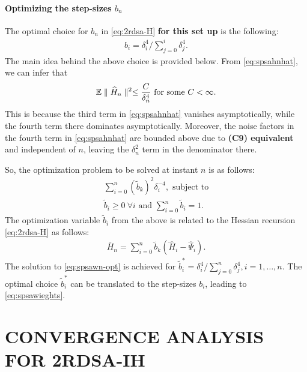 \documentclass[twocolumn]{IEEEtran}
\begin{document}
\paragraph{\textbf{Optimizing the step-sizes }$b_n$}

The optimal choice for $b_n$ in \eqref{eq:2rdsa-H} \textbf {for this set up} is the following:
\begin{align}
\label{eq:spsawieghts}
b_i  = \delta_i^{4}/\sum\limits_{j=0}^{i} \delta_j^{4}.
\end{align}
The main idea behind the above choice is provided below.
From \eqref{eq:spsahnhat}, we can infer that
\begin{align*}
\mathbb{E} \parallel \widehat H_n \parallel^2 \le \dfrac{C}{\delta_n^4} \text{ for some } C<\infty. 
\end{align*} 
This is because the third term in \eqref{eq:spsahnhat} vanishes asymptotically, while the fourth term there dominates asymptotically. Moreover, the noise factors in the fourth term in \eqref{eq:spsahnhat} are bounded above due to \textbf{(C9) equivalent } and independent of $n$, leaving the $\delta_n^2$ term in the denominator there. 

So, the optimization problem to be solved at instant $n$ is as follows:
\begin{align}
\sum \limits_{i=0}^{n} (\tilde b_k)^2 \delta_i^{-4}, \text{ subject to} \label{eq:spsawn-opt}\\
\tilde b_i \geq 0 ~\forall i \text{ and }\sum \limits_{i=0}^{n} \tilde b_i = 1.
\end{align}
The optimization variable $\tilde b_i$ from the above is related to the Hessian recursion \eqref{eq:2rdsa-H} as follows:
\begin{align}
\label{eq:spsahess}
\overline H_n = \sum\limits_{i=0}^{n} \tilde b_k(\widehat H_i -\widehat \Psi_i).
\end{align}
The solution to \eqref{eq:spsawn-opt} is achieved for $\tilde b_i^* = \delta_i^{4}/\sum \limits_{j=0}^{n} \delta_j^{4}, i=1,\ldots,n$. The optimal choice $\tilde b_i^*$ can be translated to the step-sizes $b_i$, leading to \eqref{eq:spsawieghts}.







\section{CONVERGENCE ANALYSIS FOR 2RDSA-IH}
\label{sec:2rdsa-results}

\end{document}
